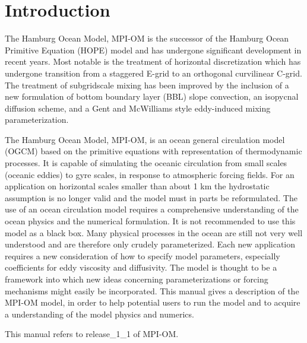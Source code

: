 %
%



\thispagestyle{empty}
 
\chapter[History and Introduction]
{\Large{\bf Introduction}}
The Hamburg Ocean Model, MPI-OM is the successor of the 
Hamburg Ocean Primitive Equation (HOPE) model and has undergone significant
development in recent years.
Most notable is the treatment of horizontal discretization
which has undergone transition from a staggered E-grid
to an orthogonal curvilinear C-grid.
The treatment of subgridscale mixing has been improved by the
inclusion of a new formulation of bottom boundary layer (BBL) slope convection,
an isopycnal diffusion scheme,
and a Gent and McWilliams style eddy-induced mixing parameterization.

The  Hamburg Ocean Model, MPI-OM, is an ocean general circulation model (OGCM) 
based on the primitive equations with representation of thermodynamic 
processes. It is capable of simulating the oceanic circulation from 
small scales (oceanic eddies) to gyre scales, in response to atmospheric 
forcing fields. For an application on horizontal scales smaller than 
about 1 km the hydrostatic assumption is no longer valid and the model 
must in parts be reformulated. The use of an ocean circulation model 
requires a comprehensive understanding of the ocean physics and the 
numerical formulation. It is not recommended to use this model as a 
black box. Many physical processes in the ocean are still not very 
well understood and are therefore only crudely parameterized. 
Each new application requires a new consideration of how to specify 
model parameters, especially coefficients for eddy viscosity and 
diffusivity. The model is thought to be a framework into which 
new ideas concerning parameterizations or forcing mechanisms might 
easily be incorporated. This manual gives a description of the MPI-OM 
model, in order to help potential users to run the model and to acquire a 
understanding of the model physics and numerics. 


This manual refers to release\_1\_1 of MPI-OM.
 


\clearpage



  
